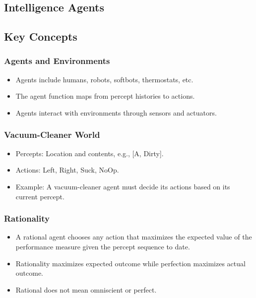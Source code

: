 \documentclass[8pt]{article}
\begin{document}
\subsection{Intelligence Agents}
\subsection{Key Concepts}
\subsubsection*{Agents and Environments}
\begin{itemize}
    \item Agents include humans, robots, softbots, thermostats, etc.
    \item The agent function maps from percept histories to actions.
    \item Agents interact with environments through sensors and actuators.
\end{itemize}

\subsubsection*{Vacuum-Cleaner World}
\begin{itemize}
    \item Percepts: Location and contents, e.g., [A, Dirty].
    \item Actions: Left, Right, Suck, NoOp.
    \item Example: A vacuum-cleaner agent must decide its actions based on its current percept.
\end{itemize}

\subsubsection*{Rationality}
\begin{itemize}
    \item A rational agent chooses any action that maximizes the expected value of the performance measure given the percept sequence to date.
    \item Rationality maximizes expected outcome while perfection maximizes actual outcome.
    \item Rational does not mean omniscient or perfect.
\end{itemize}
\end{document}
